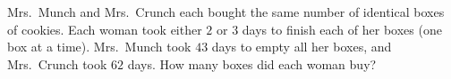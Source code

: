 Mrs.\ Munch and Mrs.\ Crunch each bought the same number of identical boxes of cookies. Each woman took either $2$ or $3$ days to finish each of her boxes (one box at a time). Mrs.\ Munch took $43$ days to empty all her boxes, and Mrs.\ Crunch took $62$ days. How many boxes did each woman buy?
